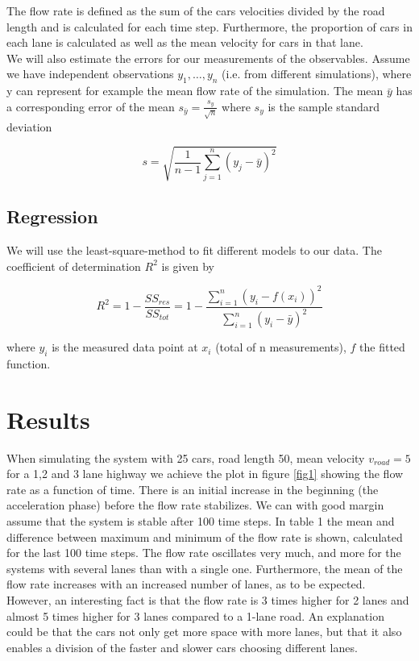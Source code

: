 \documentclass[a4paper,12pt]{article}
\begin{document}
The flow rate is defined as the sum of the cars velocities divided by the road length and is calculated for each time step. Furthermore, the proportion of cars in each lane is calculated as well as the mean velocity for cars in that lane.\\

We will also estimate the errors for our measurements of the observables. Assume we have independent observations $y_1, \dots, y_n$ (i.e. from different simulations), where y can represent for example the mean flow rate of the simulation. The mean $\bar{y}$ has a corresponding error of the mean $s_{\bar{y}} = \frac{s_y}{\sqrt{n}}$ where $s_y$ is the sample standard deviation 

\begin{equation}
	s=\sqrt{\frac{1}{n-1} \sum_{j=1}^{n}(y_j-\bar{y})^2}
\end{equation}

\subsection{Regression}
We will use the least-square-method to fit different models to our data. The coefficient of determination $R^2$ is given by

\begin{equation}
R^2 = 1 - \frac{SS_{res}}{SS_{tot}} = 1 - \frac{\sum_{i=1}^{n} (y_i-f(x_i))^2} {\sum_{i=1}^{n} (y_i-\bar{y})^2}
\end{equation} 

where $y_i$ is the measured data point at $x_i$ (total of n measurements), $f$ the fitted function.
 

\section{Results}
When simulating the system with 25 cars, road length 50, mean velocity $v_{road}=5$ for a 1,2 and 3 lane highway we achieve the plot in figure \ref{fig1} showing the flow rate as a function of time. There is an initial increase in the beginning (the acceleration phase) before the flow rate stabilizes. We can with good margin assume that the system is stable after 100 time steps. In table 1 the mean and difference between maximum and minimum of the flow rate is shown, calculated for the last 100 time steps. The flow rate oscillates very much, and more for the systems with several lanes than with a single one. Furthermore, the mean of the flow rate increases with an increased number of lanes, as to be expected. However, an interesting fact is that the flow rate is 3 times higher for 2 lanes and almost 5 times higher for 3 lanes compared to a 1-lane road. An explanation could be that the cars not only get more space with more lanes, but that it also enables a division of the faster and slower cars choosing different lanes.
\end{document}
